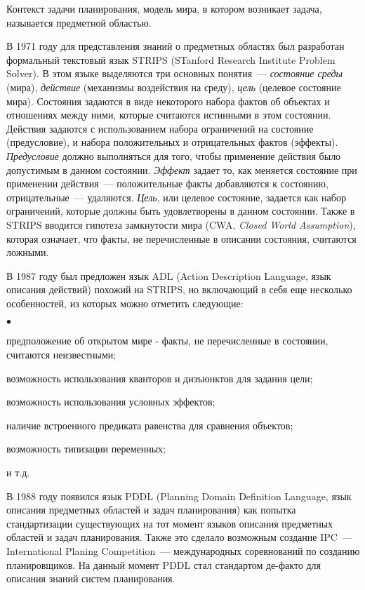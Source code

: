 \documentclass[a4paper,14pt]{extreport}
\newenvironment{compactlist}{
    \begin{list}
    {{$\bullet$}}
    {
        \setlength\partopsep{0pt}
        \setlength\parskip{0pt}
        \setlength\parsep{0pt}
        \setlength\topsep{0pt}
        \setlength\itemsep{0pt}                        
    }
}{
    \end{list}
}
\begin{document}
	Контекст задачи планирования, модель мира, в котором возникает задача,  называется предметной областью.  
	
	В 1971 году для представления знаний о предметных областях был разработан формальный текстовый язык STRIPS \cite{strips} (STanford Research Institute Problem Solver). В этом языке выделяются три основных понятия~--- \textit{состояние среды} (мира), \textit{действие} (механизмы воздействия на среду), \textit{цель} (целевое состояние мира). Состояния задаются в виде некоторого набора фактов об объектах и отношениях между ними, которые считаются истинными в этом состоянии. Действия задаются с использованием набора ограничений на состояние (предусловие), и набора положительных и отрицательных фактов (эффекты). \textit{Предусловие} должно выполняться для того, чтобы применение действия было допустимым в данном состоянии. \textit{Эффект} задает то, как меняется состояние при применении действия~--- положительные факты добавляются к состоянию, отрицательные~--- удаляются. \textit{Цель}, или целевое состояние, задается как набор ограничений, которые должны быть удовлетворены в данном состоянии. Также в STRIPS вводится гипотеза замкнутости мира (CWA, \textit{Closed World Assumption}), которая означает, что факты, не перечисленные в описании состояния, считаются ложными.
	
	В 1987 году был предложен язык ADL (Action Description Language, язык описания действий) похожий на STRIPS, но включающий в себя еще несколько особенностей, из которых можно отметить следующие:
	\begin{compactlist}
	    \item предположение об открытом мире - факты, не перечисленные в состоянии, считаются неизвестными;
	    \item возможность использования кванторов и дизъюнктов для задания цели;
	    \item возможность использования условных эффектов;
	    \item наличие встроенного предиката равенства для сравнения объектов;
	    \item возможность типизации переменных;
	    \item и т.д.
	\end{compactlist}
    
    В 1988 году появился язык PDDL\cite{pddl3} (Planning Domain Definition Language, язык описания предметных областей и задач планирования) как попытка стандартизации существующих на тот момент языков описания предметных областей и задач планирования. Также это сделало возможным создание IPC~--- International Planing Competition~--- международных соревнований по созданию планировщиков. На данный момент PDDL стал стандартом де-факто для описания знаний систем планирования.
  
\end{document}
